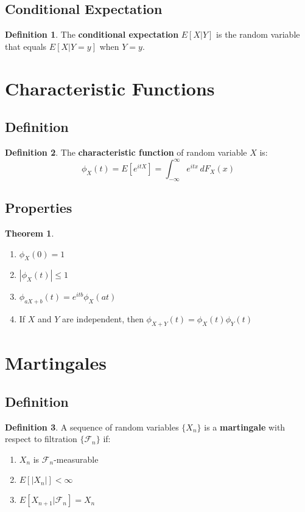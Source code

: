\documentclass[11pt]{article}
\theoremstyle{definition}
\newtheorem{definition}{Definition}[section]
\newtheorem{theorem}{Theorem}[section]
\begin{document}
\subsection{Conditional Expectation}
\begin{definition}
The \textbf{conditional expectation} $E[X|Y]$ is the random variable that equals $E[X|Y=y]$ when $Y=y$.
\end{definition}

\section{Characteristic Functions}

\subsection{Definition}
\begin{definition}
The \textbf{characteristic function} of random variable $X$ is:
$$\phi_X(t) = E[e^{itX}] = \int_{-\infty}^{\infty} e^{itx} \, dF_X(x)$$
\end{definition}

\subsection{Properties}
\begin{theorem}
\begin{enumerate}
    \item $\phi_X(0) = 1$
    \item $|\phi_X(t)| \leq 1$
    \item $\phi_{aX+b}(t) = e^{itb}\phi_X(at)$
    \item If $X$ and $Y$ are independent, then $\phi_{X+Y}(t) = \phi_X(t)\phi_Y(t)$
\end{enumerate}
\end{theorem}

\section{Martingales}

\subsection{Definition}
\begin{definition}
A sequence of random variables $\{X_n\}$ is a \textbf{martingale} with respect to filtration $\{\mathcal{F}_n\}$ if:
\begin{enumerate}
    \item $X_n$ is $\mathcal{F}_n$-measurable
    \item $E[|X_n|] < \infty$
    \item $E[X_{n+1}|\mathcal{F}_n] = X_n$
\end{enumerate}
\end{definition}
\end{document}
